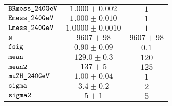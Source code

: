 \begin{tabular}{lcc}
$\verb+BRmess_240GeV+ $ & $  1.000\pm 0.002$ & $ 1$\\
$\verb+Emess_240GeV+ $ & $  1.000\pm 0.010$ & $ 1$\\
$\verb+Lmess_240GeV+ $ & $  1.0000\pm 0.0010$ & $ 1$\\
$\verb+N+ $ & $  9607\pm 98$ & $ 9607\pm 98$\\
$\verb+fsig+ $ & $  0.90\pm 0.09$ & $ 0.1$\\
$\verb+mean+ $ & $  129.0\pm 0.3$ & $ 120$\\
$\verb+mean2+ $ & $  137\pm 5$ & $ 125$\\
$\verb+muZH_240GeV+ $ & $  1.00\pm 0.04$ & $ 1$\\
$\verb+sigma+ $ & $  3.4\pm 0.2$ & $ 2$\\
$\verb+sigma2+ $ & $  5\pm 1$ & $ 5$\\
\end{tabular}
